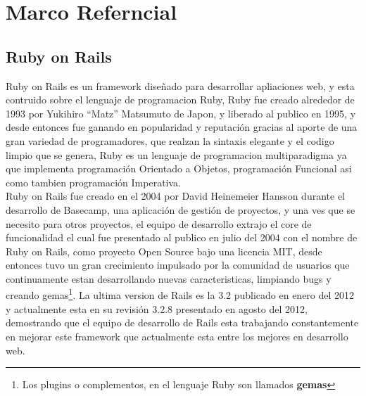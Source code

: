 \chapter{Marco Referncial} %
\label{cha:marco_referncial}

    

  \section{Ruby on Rails} %
  \label{sec:ruby_on_rails}
    Ruby on Rails es un framework dise\~nado para desarrollar apliaciones web, 
    y esta contruido sobre el lenguaje de programacion Ruby, Ruby  fue creado
    alrededor de 1993 por Yukihiro ``Matz'' Matsumuto de Japon, y liberado al 
    publico en 1995, y desde entonces fue ganando en popularidad y 
    reputaci\'on gracias al aporte de una gran variedad de programadores, que 
    realzan la sintaxis elegante y el codigo limpio que se genera, Ruby es un 
    lenguaje de programacion multiparadigma ya que implementa programaci\'on 
    Orientado a Objetos, programaci\'on Funcional asi como tambien 
    programaci\'on Imperativa. \\

    Ruby on Rails fue creado en el 2004 por David Heinemeier Hansson durante el desarrollo de Basecamp, una aplicación de gesti\'on de proyectos, y una ves que se necesito para otros proyectos, el equipo de desarrollo extrajo el core de funcionalidad el cual fue presentado al publico en julio del 2004 con el nombre de Ruby on Rails, como proyecto Open Source bajo una licencia MIT, desde entonces tuvo un gran  crecimiento impulsado por la comunidad de usuarios que continuamente estan desarrollando nuevas caracteristicas, limpiando bugs y creando gemas\footnote{ Los plugins o complementos, en el lenguaje Ruby son llamados \textbf{gemas}}. La ultima version de Rails es la 3.2 publicado en enero del 2012 y actualmente esta en su revisi\'on 3.2.8 presentado en agosto del 2012,  demostrando que el equipo de desarrollo de Rails esta trabajando constantemente en mejorar este framework que actualmente esta entre los mejores en desarrollo web.\\

